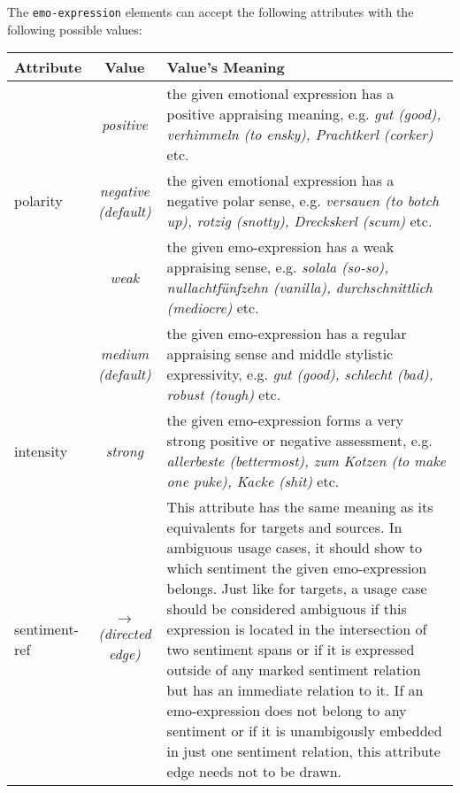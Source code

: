 \documentclass[11pt,a4paper]{article}
\newlength\clmnwidth
\begin{document}
The \texttt{emo-expression} elements can accept the following
attributes with the following possible values:
\begin{center}
  \begin{tabular}{|l|c|p{\clmnwidth}|}\hline\label{tbl-emo}
    Attribute & Value & Value's Meaning\\\hline

    & \textit{positive} & the given emotional expression has a
    positive appraising meaning, e.g. \textit{gut (good), verhimmeln
      (to ensky), Prachtkerl (corker)} etc.\\\cline{2-3}

    \multirow{-2}{*}{polarity} & \textit{negative\newline(default)} &
    the given emotional expression has a negative polar sense,
    e.g. \textit{versauen (to botch up), rotzig (snotty), Dreckskerl
      (scum)} etc.\\\hline


    & \textit{weak} & the given emo-expression has a weak appraising
    sense, e.g. \textit{solala (so-so), nullachtf\"unfzehn (vanilla),
      durchschnittlich (mediocre)} etc.\\\cline{2-3}

    & \textit{medium\newline(default)} & the given emo-expression has
    a regular appraising sense and middle stylistic expressivity,
    e.g. \textit{gut (good), schlecht (bad), robust (tough)}
    etc.\\\cline{2-3}

    \multirow{-3}{*}{intensity} & \textit{strong} & the given
    emo-expression forms a very strong positive or negative
    assessment, e.g. \textit{allerbeste (bettermost), zum Kotzen (to
      make one puke), Kacke (shit)} etc.\\\hline


    sentiment-ref & \textit{$\longrightarrow$\newline(directed edge)}
    & This attribute has the same meaning as its equivalents for
    targets and sources.  In ambiguous usage cases, it should show to
    which sentiment the given emo-expression belongs.  Just like for
    targets, a usage case should be considered ambiguous if this
    expression is located in the intersection of two sentiment spans
    or if it is expressed outside of any marked sentiment relation but
    has an immediate relation to it.  If an emo-expression does not
    belong to any sentiment or if it is unambigously embedded in just
    one sentiment relation, this attribute edge needs not to be
    drawn.\\\hline
  \end{tabular}
\end{center}
\end{document}
